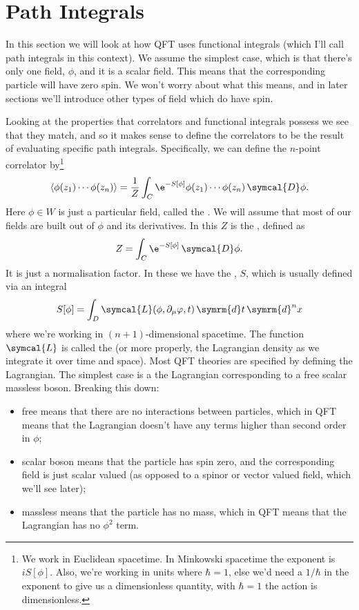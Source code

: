 \documentclass[fleqn]{NotesClass}
\renewcommand{\dd}[1]{\,\symrm{d}#1}
\newcommand{\DD}{\,\symcal{D}}
\DeclarePairedDelimiter{\correlator}{\langle}{\rangle}
\newcommand{\lagrangian}{\symcal{L}}
\begin{document}
    \section{Path Integrals}
    In this section we will look at how QFT uses functional integrals (which I'll call path integrals in this context).
    We assume the simplest case, which is that there's only one field, \(\phi\), and it is a scalar field.
    This means that the corresponding particle will have zero spin.
    We won't worry about what this means, and in later sections we'll introduce other types of field which do have spin.
    
    Looking at the properties that correlators and functional integrals possess we see that they match, and so it makes sense to define the correlators to be the result of evaluating specific path integrals.
    Specifically, we can define the \(n\)-point correlator by\footnote{We work in Euclidean spacetime. In Minkowski spacetime the exponent is \(iS[\phi]\). Also, we're working in units where \(\hbar = 1\), else we'd need a \(1/\hbar\) in the exponent to give us a dimensionless quantity, with \(\hbar = 1\) the action is dimensionless.}
    \begin{equation}
        \correlator{\phi(z_1) \dotsm \phi(z_n)} = \frac{1}{Z} \int_C \e^{-S[\phi]} \phi(z_1) \dotsb \phi(z_n) \DD\phi.
    \end{equation}
    Here \(\phi \in W\) is just a particular field, called the .
    We will assume that most of our fields are built out of \(\phi\) and its derivatives.
    In this \(Z\) is the , defined as
    \begin{equation}
        Z = \int_C \e^{-S[\phi]} \DD\phi.
    \end{equation}
    It is just a normalisation factor.
    In these we have the , \(S\), which is usually defined via an integral
    \begin{equation}
        S[\phi] = \int_D \lagrangian(\phi, \partial_\mu \varphi, t) \dd{t}\dd{^nx}
    \end{equation}
    where we're working in \((n + 1)\)-dimensional spacetime.
    The function \(\lagrangian\) is called the  (or more properly, the Lagrangian density as we integrate it over time and space).
    Most QFT theories are specified by defining the Lagrangian.
    The simplest case is a the Lagrangian corresponding to a free scalar massless boson.
    Breaking this down:
    \begin{itemize}
        \item free means that there are no interactions between particles, which in QFT means that the Lagrangian doesn't have any terms higher than second order in \(\phi\);
        \item scalar boson means that the particle has spin zero, and the corresponding field is just scalar valued (as opposed to a spinor or vector valued field, which we'll see later);
        \item massless means that the particle has no mass, which in QFT means that the Lagrangian has no \(\phi^2\) term.
    \end{itemize}
\end{document}

